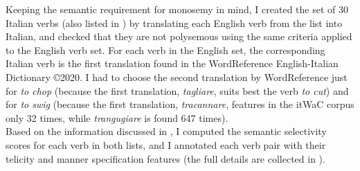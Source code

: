 Keeping the semantic requirement for monosemy in mind, I created the set of 30 Italian verbs (also listed in ) by translating each English verb from the list into Italian, and checked that they are not polysemous using the same criteria applied to the English verb set. For each verb in the English set, the corresponding Italian verb is the first translation found in the WordReference English-Italian Dictionary \copyright 2020. I had to choose the second translation by WordReference just for \textit{to chop} (because the first translation, \textit{tagliare}, suits best the verb \textit{to cut}) and for \textit{to swig} (because the first translation, \textit{tracannare}, features in the itWaC corpus only 32 times, while \textit{trangugiare} is found 647 times).\\
Based on the information discussed in , I computed the semantic selectivity scores for each verb in both lists, and I annotated each verb pair with their telicity and manner specification features (the full details are collected in ).\\

